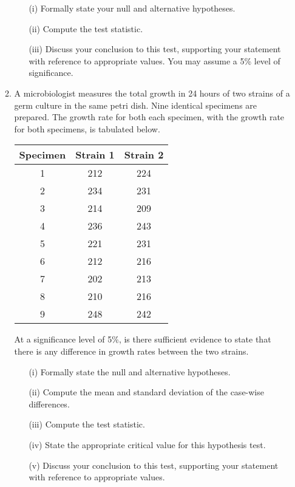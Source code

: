 \documentclass[a4paper,12pt]{article}
\begin{document}
\begin{enumerate}
\begin{enumerate}
	\begin{itemize}
		\item[(i)] Formally state your null and alternative hypotheses.
		\item[(ii)] Compute the test statistic.
		\item[(iii)] Discuss your conclusion to this test, supporting your statement with reference to appropriate values. You may assume a 5\% level of significance.
	\end{itemize}
	\item A microbiologist measures the total growth in 24 hours of two strains of a germ culture  in the same petri dish. Nine identical specimens are prepared. The growth rate for both each specimen, with the growth rate for both specimens, is tabulated below.
	
	\begin{center}
		\begin{tabular}{|c|c|c|} \hline 
			Specimen &	Strain 1	&	Strain 2	\\ \hline \hline
			1 & 212 & 224 \\ \hline
			2 & 234 & 231 \\ \hline
			3 & 214 & 209 \\ \hline
			4 & 236 & 243 \\ \hline
			5 & 221 & 231 \\ \hline 
			6 & 212 & 216 \\ \hline
			7 & 202 & 213 \\ \hline 
			8 & 210 & 216 \\ \hline
			9 & 248 & 242 \\ \hline
		\end{tabular} 
	\end{center}
	\noindent At a significance level of 5\%, is there sufficient evidence to state that there is any difference in growth rates between the two strains.
	
	
	\bigskip
	
	\begin{itemize}
		\item[(i)] Formally state the null and alternative hypotheses.
		\item[(ii)]  Compute the mean and standard deviation of the case-wise differences.
		\item[(iii)] Compute the test statistic.
		\item[(iv)] State the appropriate critical value for this hypothesis test. 
		\item[(v)] Discuss your conclusion to this test, supporting your statement with reference to appropriate values.
	\end{itemize}
\end{enumerate}


\end{enumerate}
\end{document}
